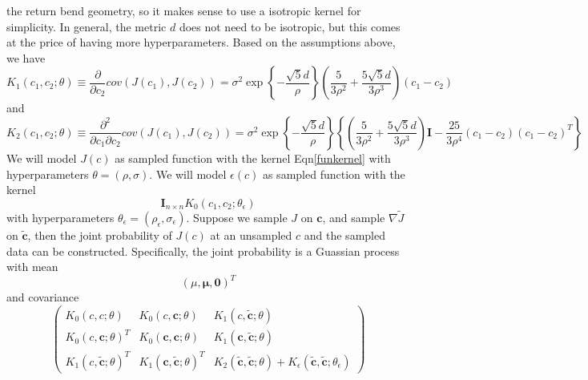 \documentclass[a4paper,onecolumn]{article}
\theoremstyle{remark}
\begin{document}
the return bend geometry, so it makes sense to use a isotropic kernel for simplicity.
In general, the metric $d$ does not need to be isotropic, but this comes at the price
of having more hyperparameters.
\noindent Based on the assumptions above, we have
\begin{equation}
    K_1(c_1, c_2; \theta) \equiv
    \frac{\partial}{\partial c_2} cov(J(c_1), J(c_2)) =
    \sigma^2 \exp\left\{-\frac{\sqrt{5}d}{\rho}\right\}
    \left(\frac{5}{3\rho^2}
    + \frac{5\sqrt{5}d}{3\rho^3}\right) (c_1-c_2)
\end{equation}
and
\begin{equation}
    K_2(c_1, c_2; \theta) \equiv
    \frac{\partial^2}{\partial c_1\partial c_2} cov(J(c_1),J(c_2))
    = \sigma^2 \exp\left\{-\frac{\sqrt{5}d}{\rho}\right\}
    \left\{
        \left(\frac{5}{3\rho^2} + \frac{5\sqrt{5}d}{3\rho^3}\right)\boldsymbol{I}
        - \frac{25}{3\rho^4} (c_1-c_2) (c_1-c_2)^T
    \right\}
\end{equation}
We will model $J(c)$ as sampled function with the kernel Eqn\eqref{funkernel} with
hyperparameters $\theta = (\rho, \sigma)$.
We will model $\epsilon(c)$ as sampled function with the kernel
\begin{equation}
    \boldsymbol{I}_{n\times n} K_0(c_1, c_2; \theta_\epsilon)
    \label{noise kernel}
\end{equation}
with hyperparameters $\theta_\epsilon = (\rho_\epsilon, \sigma_\epsilon)$.
Suppose we sample $J$ on $\mathbf{c}$, and sample $\nabla \tilde{J}$ on
$\mathbf{\tilde{c}}$, then the joint probability of $J(c)$ at an unsampled $c$ 
and the sampled data can be constructed.
Specifically, the joint probability is a Guassian process with mean
\begin{equation}
    \left(\mu , \boldsymbol{\mu} , \mathbf{0}\right)^T
\end{equation}
and covariance
\begin{equation}
    \begin{pmatrix}
        K_0 (c, c; \theta) & K_0(c, \mathbf{c};\theta) & K_1(c, \tilde{\mathbf{c}}; \theta)\\
        K_0 (c, \mathbf{c}; \theta)^T & K_0(\mathbf{c}, \mathbf{c};\theta) 
        & K_1(\mathbf{c}, \tilde{\mathbf{c}}; \theta)\\
        K_1(c, \tilde{\mathbf{c}}; \theta)^T & K_1(\mathbf{c},\tilde{\mathbf{c}}; \theta)^T &
        K_2(\tilde{\mathbf{c}}, \tilde{\mathbf{c}}; \theta) + 
        K_\epsilon (\tilde{\mathbf{c}}, \tilde{\mathbf{c}}; \theta_\epsilon)
    \end{pmatrix}
\end{equation}
\end{document}
